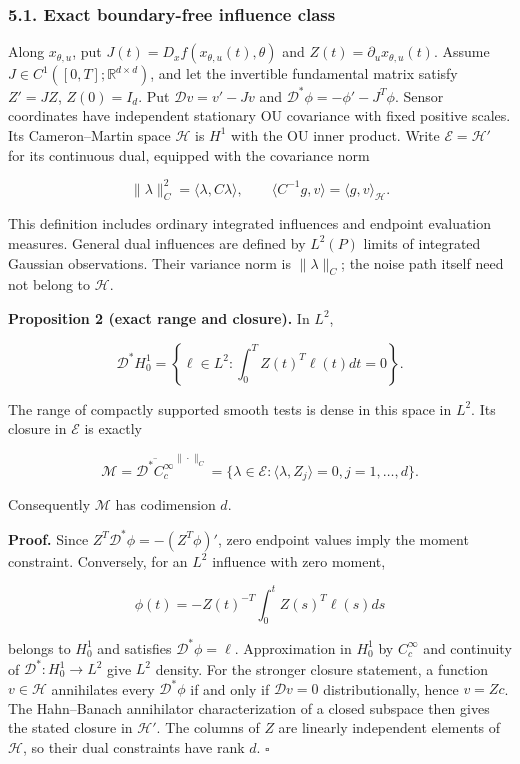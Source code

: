 \documentclass[
  american,
  11pt,
]{article}
\begin{document}
\subsubsection{5.1. Exact boundary-free influence
class}\label{exact-boundary-free-influence-class}

Along \(x_{\theta,u}\), put \(J(t)=D_xf(x_{\theta,u}(t),\theta)\) and
\(Z(t)=\partial_u x_{\theta,u}(t)\). Assume
\(J\in C^1([0,T];\mathbb R^{d\times d})\), and let the invertible
fundamental matrix satisfy \(Z'=JZ\), \(Z(0)=I_d\). Put
\(\mathcal D v=v'-Jv\) and \(\mathcal D^*\phi=-\phi'-J^T\phi\). Sensor
coordinates have independent stationary OU covariance with fixed
positive scales. Its Cameron--Martin space \(\mathcal H\) is \(H^1\)
with the OU inner product. Write \(\mathcal E=\mathcal H'\) for its
continuous dual, equipped with the covariance norm

\[
\|\lambda\|_C^2=\langle\lambda,C\lambda\rangle,
\qquad
\langle C^{-1}g,v\rangle=\langle g,v\rangle_{\mathcal H}.
\]

This definition includes ordinary integrated influences and endpoint
evaluation measures. General dual influences are defined by \(L^2(P)\)
limits of integrated Gaussian observations. Their variance norm is
\(\|\lambda\|_C\); the noise path itself need not belong to
\(\mathcal H\).

\textbf{Proposition 2 (exact range and closure).} In \(L^2\),

\[
\mathcal D^*H_0^1
=\left\{\ell\in L^2:\int_0^T Z(t)^T\ell(t)dt=0\right\}.
\]

The range of compactly supported smooth tests is dense in this space in
\(L^2\). Its closure in \(\mathcal E\) is exactly

\[
\mathcal M=\overline{\mathcal D^*C_c^\infty}^{\|\cdot\|_C}
=\{\lambda\in\mathcal E:\langle\lambda,Z_j\rangle=0, j=1,\ldots,d\}.
\]

Consequently \(\mathcal M\) has codimension \(d\).

\textbf{Proof.} Since \(Z^T\mathcal D^*\phi=-(Z^T\phi)'\), zero endpoint
values imply the moment constraint. Conversely, for an \(L^2\) influence
with zero moment,

\[
\phi(t)=-Z(t)^{-T}\int_0^t Z(s)^T\ell(s)ds
\]

belongs to \(H_0^1\) and satisfies \(\mathcal D^*\phi=\ell\).
Approximation in \(H_0^1\) by \(C_c^\infty\) and continuity of
\(\mathcal D^*:H_0^1\to L^2\) give \(L^2\) density. For the stronger
closure statement, a function \(v\in\mathcal H\) annihilates every
\(\mathcal D^*\phi\) if and only if \(\mathcal D v=0\) distributionally,
hence \(v=Zc\). The Hahn--Banach annihilator characterization of a
closed subspace then gives the stated closure in \(\mathcal H'\). The
columns of \(Z\) are linearly independent elements of \(\mathcal H\), so
their dual constraints have rank \(d\). \(\square\)
\end{document}
